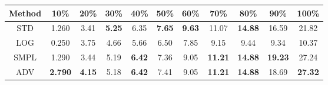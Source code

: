 \documentclass{standalone}
\begin{document}
\begin{tabular}{c|cccccccccc}
      \toprule
      Method & 10\% & 20\% & 30\% & 40\% & 50\% & 60\% & 70\% & 80\% & 90\% & 100\% \\
      \midrule
STD & 1.260 & 3.41 & \textbf{5.25} & 6.35 & \textbf{7.65} & \textbf{9.63} & 11.07 & \textbf{14.88} & 16.59 & 21.82\\
LOG & 0.250 & 3.75 & 4.66 & 5.66 & 6.50 & 7.85 & 9.15 & 9.44 & 9.34 & 10.37\\
SMPL & 1.290 & 3.44 & 5.19 & \textbf{6.42} & 7.36 & 9.05 & \textbf{11.21} & \textbf{14.88} & \textbf{19.23} & 27.24\\
ADV & \textbf{2.790} & \textbf{4.15} & 5.18 & \textbf{6.42} & 7.41 & 9.05 & \textbf{11.21} & \textbf{14.88} & 18.69 & \textbf{27.32}\\
  \bottomrule
\end{tabular}
\end{document}
